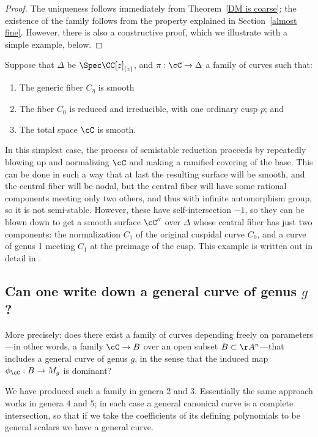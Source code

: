 \begin{proof} The uniqueness follows immediately from Theorem~\ref{DM is coarse}; the existence of the family follows from the property explained in Section~\ref{almost fine}. However, there is also a constructive proof, which we  illustrate with a simple example, below.
\end{proof}

\begin{example}
Suppose that 
$\Delta$ be $\Spec \CC[z]_{(z)}$, and $\pi : \cC \to \Delta$ a family of curves such that:
\begin{enumerate}
\item The generic fiber $C_\eta$ is smooth
\item The fiber $C_0$ is reduced and irreducible, with one ordinary cusp $p$; and
\item The total space $\cC$ is smooth.
\end{enumerate}
In this simplest case, the process of semistable reduction proceeds by repeatedly  blowing up and normalizing $\cC$
and  making a ramified
covering of the base. This can be done in such a way that at last
the resulting surface will be smooth, and the central fiber will be nodal, but the  central 
fiber will have some rational components meeting only
two others, and thus with infinite automorphism group, so it is not semi-stable. 
However, these have self-intersection $-1$,
so they can be blown down to get a smooth surface $\cC''$ over $\Delta$ whose central fiber has just two components:
the normalization $C_1$ of the original cuspidal curve $C_0$, and a curve of genus 1 meeting $C_1$ at the preimage
of the cusp.
This example is written out in detail in \cite[pp. 122-128]{MR1631825}.%
\end{example}


\subsection{Can one write down a general curve of genus $g$?}\label{mgunirational}

More precisely: does there exist  a family of curves depending freely on parameters---in other words, a family $\cC \to B$ over an open subset $B \subset \AA^n$---that includes a general curve of genus $g$, in the sense that the induced map $\phi_\cC : B \to M_g$ is dominant? 	

We have produced such a family in genera 2 and 3. Essentially
the same approach works in genera $4$ and $5$; in each case a general canonical curve is a complete intersection, so that if we take the coefficients of its defining polynomials to be general scalars we have a general curve.

